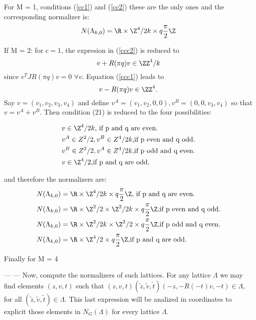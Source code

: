 \documentclass[11pt]{amsart}
\theoremstyle{plain}
\theoremstyle{definition}
\theoremstyle{remark}
\begin{document}
For M = 1, conditions (\ref{cc1}) and (\ref{cc2}) these are the only ones and the corresponding normalizer is:
\begin{equation*}
    N(\Lambda_{k,0}) = \R \times \Z^4 / {2k} \times q \frac{\pi}{2} \Z
\end{equation*}

If M = 2: for $c=1$, the expresion in (\ref{ccc2}) is reduced to $$ v + R(\pi q) v \in \ZZ^4/k $$ since $v^T J R(\pi q) v = 0 \,\, \forall v$. Equation (\ref{ccc1}) leads to $$ v - R(\pi q) v \in \ZZ^4. $$ Say $v = (v_1, v_2, v_3, v_4)$ and define $v^A = (v_1, v_2, 0,0), v^B = (0,0,v_3,v_4)$ so that $v = v^A + v^B$. Then condition (21) is reduced to the four possibilities:

\begin{align*}
    &v \in \Z^4 / {2k} \text{, if p and q are even.} \\
    &v^A \in Z^2 / 2, v^B \in Z^4 / 2k \text{,if p even and q odd.} \\
    &v^B \in Z^2 / 2, v^A \in Z^4 / 2k \text{,if p odd and q even.} \\
    &v \in \Z^4 / {2} \text{,if p and q are odd.}  
\end{align*}

and therefore the normalizers are:
\begin{align*}
    N(\Lambda_{k,0}) &= \R \times \Z^4 /{2k} \times q \frac{\pi}{2} \Z \text{, if p and q are even.} \\
    N(\Lambda_{k,0}) &= \R \times \Z^2 /2 \times \Z^2 / {2k}  \times q \frac{\pi}{2} \Z \text{,if p even and q odd.} \\
    N(\Lambda_{k,0}) &= \R \times \Z^2 / {2k} \times \Z^2 / 2 \times q \frac{\pi}{2} \Z \text{,if p odd and q even.} \\
    N(\Lambda_{k,0}) &= \R \times \Z^4 / 2 \times q \frac{\pi}{2} \Z \text{,if p and q are odd.}  
\end{align*}

Finally for M = 4


---
---  
  Now, compute the normalizers of such lattices. For any lattice $\Lambda$ we may find elements $(z,v,t)$ such  that
  $(z,v,t)(\tilde{z},\tilde{v},\tilde{t})(-z,-R(-t)v,-t)\in \Lambda$, for  all $(\tilde{z},\tilde{v},\tilde{t})\in \Lambda$. This last expression will be analized in coordinates to explicit those elements in $N_G(\Lambda)$ for every lattice $\Lambda$.
  
 
  
\end{document}
